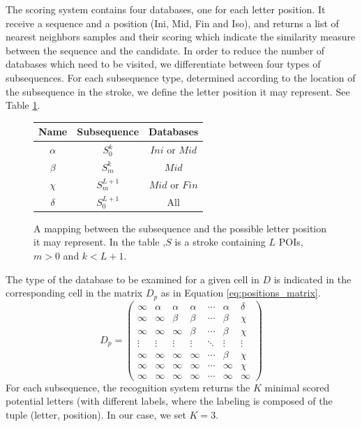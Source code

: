 \documentclass[10pt, conference, compsocconf]{IEEEtran}
\begin{document}
The scoring system contains four databases, one for each letter position. 
It receive a sequence and a position (Ini, Mid, Fin and Iso), and returns a list of nearest neighbors samples and their scoring which indicate the similarity measure between the sequence and the candidate.
In order to reduce the number of databases which need to be visited, we differentiate between four types of subsequences.
For each subsequence type, determined according to the location of the subsequence in the stroke, we define the letter position it may represent. See Table \ref{table:subsequences_types}.\\
\begin{figure}
\centering
\renewcommand{\arraystretch}{1.2}
\begin{tabular}{| c |c | c |}
\hline
  Name     & Subsequence    & Databases       \\
\hline
  $\alpha$ & $S_0^{k}$         & $Ini$ or $Mid$  \\
\hline
  $\beta$  & $S_{m}^{k}$     & $Mid$              \\
\hline
  $\chi$    & $S_{m}^{L+1}$ & $Mid$ or $Fin$   \\
\hline
  $\delta$ & $S_0^{L+1}$     & All                   \\
\hline
\end{tabular}
\caption{A mapping between the subsequence and the possible letter position it may represent. In the table ,$S$ is a stroke containing $L$ POIs, $m>0$ and $k<L+1$.}
\label{table:subsequences_types}
\end{figure}

The type of the database to be examined for a given cell in $D$ is indicated in the corresponding cell in the matrix $D_p$ as in Equation \ref{eq:positions_matrix}. \\

\begin{equation}
D_{p}=
\left( 
\begin{array}{ccccccc}
\infty 	& \alpha & \alpha & \alpha  & \cdots & \alpha & \delta \\
\infty  & \infty  & \beta   & \beta   & \cdots  & \beta  & \chi    \\
\infty  & \infty  & \infty   & \beta   & \cdots  & \beta  & \chi    \\
\vdots & \vdots & \vdots  & \vdots & \ddots  & \vdots & \vdots \\
\infty  & \infty  & \infty   & \infty   & \cdots  & \beta  & \chi    \\
\infty  & \infty  & \infty   & \infty   & \cdots  & \infty  & \chi    \\
\infty  & \infty  & \infty   & \infty   & \cdots  & \infty  & \infty \end{array} \right)
\label{eq:positions_matrix}
\end{equation}
For each subsequence, the recognition system returns the $K$ minimal scored potential letters (with different labels, where the labeling is composed of the tuple (letter, position). In our case, we set $K=3$.\\
\end{document}

